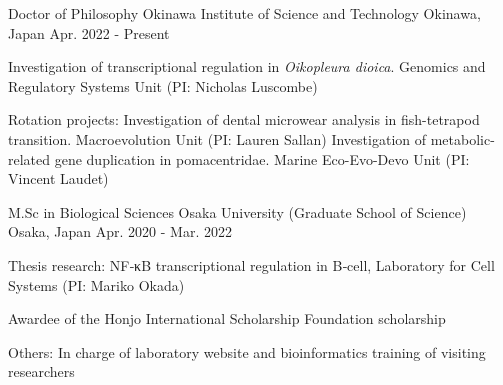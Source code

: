 

\begin{cventries}

  \cventry
    {Doctor of Philosophy} %
    {Okinawa Institute of Science and Technology} %
    {Okinawa, Japan} %
    {Apr. 2022 - Present} %
    {
      \begin{cvitems} %
        \item {Investigation of transcriptional regulation in \textit{Oikopleura dioica}. Genomics and Regulatory Systems Unit (PI: Nicholas Luscombe)}
        \item {Rotation projects:\newline
        Investigation of dental microwear analysis in fish-tetrapod transition. Macroevolution Unit (PI: Lauren Sallan) \newline
        Investigation of metabolic-related gene duplication in pomacentridae. Marine Eco-Evo-Devo Unit (PI: Vincent Laudet)
        }
      \end{cvitems}
    }

\end{cventries}


\begin{cventries}

  \cventry
    {M.Sc in Biological Sciences} %
    {Osaka University (Graduate School of Science)} %
    {Osaka, Japan} %
    {Apr. 2020 - Mar. 2022} %
    {
      \begin{cvitems} %
        \item {Thesis research: NF‑κB transcriptional regulation in B‑cell, Laboratory for Cell Systems (PI: Mariko Okada)}
        \item {Awardee of the Honjo International Scholarship Foundation scholarship}
        \item {Others: In charge of laboratory website and bioinformatics training of visiting researchers}
      \end{cvitems}
    }

\end{cventries}


